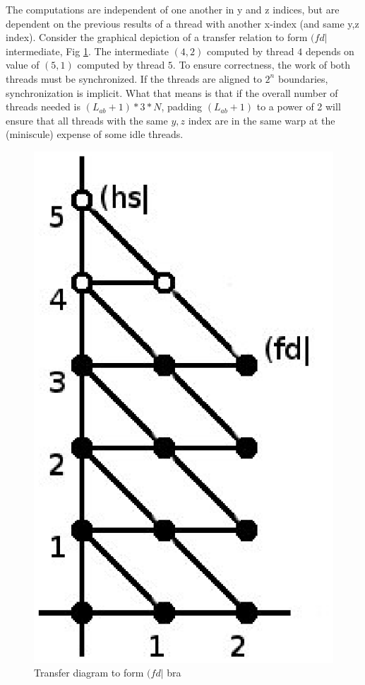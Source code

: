\documentclass[12pt]{article}
\begin{document}
The computations are independent of one another in y and z indices, but are
dependent on the previous results of a thread with another x-index
(and same y,z index).  Consider the graphical depiction of a transfer
relation to form $(fd|$ intermediate, Fig \ref{transfer}.  The intermediate
$(4,2)$ computed by thread $4$ depends on value of $(5,1)$ computed by
thread $5$.  To ensure correctness, the work of both threads must be
synchronized.  If the threads are aligned to $2^n$ boundaries,
synchronization is implicit.  What that means is that if the overall number
of threads needed is $(L_{ab}+1)*3*N$, padding $(L_{ab}+1)$ to a power
of 2 will ensure that all threads with the same $y,z$ index are in the
same warp at the (miniscule) expense of some idle threads.

\begin{figure}[here]
\begin{center}
\includegraphics[scale=0.5]{transfer.eps}
\caption{Transfer diagram to form $(fd|$ bra}
\label{transfer}
\end{center}
\end{figure}
\end{document}
